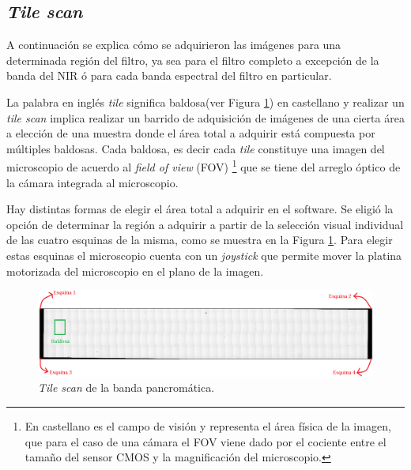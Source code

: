 \singlespacing
\subsection{\textit{Tile scan}}

\hspace{0.5cm}A continuación se explica cómo se adquirieron las imágenes para una determinada región del filtro, ya sea para el filtro completo a excepción de la banda del NIR ó para cada banda espectral del filtro en particular.

La palabra en inglés \textit{tile} significa baldosa(ver Figura \ref{fig:tilescan}) en castellano y realizar un \textit{tile scan} implica realizar un barrido de adquisición de imágenes de una cierta área a elección de una muestra donde el área total a adquirir está compuesta por múltiples baldosas. Cada baldosa, es decir cada \textit{tile} constituye una imagen del microscopio de acuerdo al \textit{field of view} (FOV) \footnote{En castellano es el campo de visión y representa el área física de la imagen, que para el caso de una cámara el FOV viene dado por el cociente entre el tamaño del sensor CMOS y la magnificación del microscopio.} que se tiene del arreglo óptico de la cámara integrada al microscopio.

Hay distintas formas de elegir el área total a adquirir en el software. Se eligió la opción de determinar la región a adquirir a partir de la selección visual individual de las cuatro esquinas de la misma, como se muestra en la Figura \ref{fig:tilescan}. Para elegir estas esquinas el microscopio cuenta con un \textit{joystick} que permite mover la platina motorizada del microscopio en el plano de la imagen.

\begin{figure}[H]
	\centering
	\includegraphics[width=1.0\textwidth]{Figs/cuantificaciondefectos/tilescan.png}
	\caption{\textit{Tile scan} de la banda pancromática.}
	\label{fig:tilescan}
\end{figure} 

